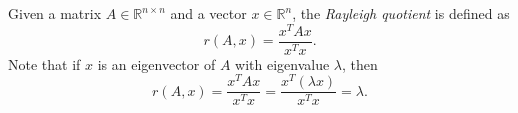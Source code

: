 \begin{definition}
Given a matrix $A\in\mathbb{R}^{n\times n}$ and a vector $x\in\mathbb{R}^n$, the \emph{Rayleigh quotient} is defined as
\begin{equation*}
    r(A,x) = \frac{x^TAx}{x^Tx}.
\end{equation*}
Note that if $x$ is an eigenvector of $A$ with eigenvalue $\lambda$, then
\begin{equation*}
    r(A,x)=\frac{x^TAx}{x^Tx}=\frac{x^T (\lambda x)}{x^T x}=\lambda.
\end{equation*}
\end{definition}